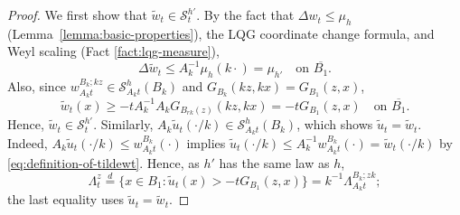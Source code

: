 \documentclass[12pt]{amsart}
\numberwithin{equation}{section}
\newcommand{\lss}[2]{\hyperref[eq:least-super-solution]{w^{#1}_{#2}}}
\newcommand{\cluster}[2]{\hyperref[eq:non-co-set]{\mathit{\Lambda}^{#1}_{#2}}}
\begin{document}
\begin{proof}
		We first show that $\tilde{w}_t \in \mathcal{S}^{h'}_t$. By the fact that $\Delta \lss{}{t} \leq \mu_h$ (Lemma~\ref{lemma:basic-properties}), the LQG coordinate change formula, and Weyl scaling (Fact \ref{fact:lqg-measure}), 
		\begin{equation}
		\Delta \tilde{w}_{t} \leq A_k^{-1} \mu_h(k\cdot) = \mu_{h'}  \quad  \mbox{on $\overline{B_1}$}.
		\end{equation}
		Also, since $\lss{B_{k};k z}{A_k t} \in \mathcal{S}^h_{A_k t}(B_{k})$ and $G_{B_{k}}(k z,  k x) = G_{B_{1}}(z, x)$, 
		\begin{equation}
		\tilde{w}_{t}(x) \geq -t A^{-1}_{k} A_k G_{B_{r k}(z)}(k z, k x) = - t G_{B_1}(z, x) \quad  \mbox{on $\overline{B_1}$}.
		\end{equation}
		Hence, $\tilde{w}_t \in \mathcal{S}^{h'}_t$.
		Similarly, $A_k \tilde{u}_t(\cdot/k) \in \mathcal{S}^h_{A_k t}(B_k)$, which shows 
		$\tilde{u}_t = \tilde{w}_t$.
		Indeed, $A_k \tilde{u}_t(\cdot/k) \leq \lss{B_{k}}{A_k t}(\cdot)$ implies $\tilde{u}_t(\cdot/k) \leq A_k^{-1} \lss{B_{k}}{A_k t}(\cdot) = \tilde{w}_{t}(\cdot/k)$ by \eqref{eq:definition-of-tildewt}.
		Hence, as $h'$ has the same law as $h$,
		\begin{equation}
		\cluster{z}{t} \overset{d}{=} \{ x \in B_1 : \tilde{u}_t(x) > -t G_{B_1}(z, x) \} = k^{-1} \cluster{B_{k }; z k}{A_k t};
		\end{equation}
		the last equality uses $\tilde{u}_t = \tilde{w}_t$.
	\end{proof}
	
	
	
	
	
	
	
\end{document}
